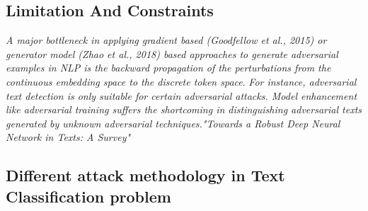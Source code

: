 \documentclass[%
	BCOR=8mm, %
	DIV=12, 
	toc=bibliography, %
	toc=listof, %
	oneside, %
	egregdoesnotlikesansseriftitles, %
	]{scrbook}
\begin{document}
\subsection{Limitation And Constraints}
\textit{A major bottleneck in applying gradient based (Goodfellow et al., 2015) or generator model (Zhao et al., 2018) based approaches to generate adversarial examples in NLP is
 the backward propagation of the perturbations from the continuous embedding space to the discrete token space}.\cite{garg_bae_2020} \textit{For instance, adversarial text detection 
 is only suitable for certain adversarial attacks. Model enhancement like adversarial training suffers the shortcoming in distinguishing adversarial texts generated by unknown adversarial 
 techniques."Towards a Robust Deep Neural Network in Texts: A Survey\(\)"} 
 
 
\subsection{Different attack methodology in Text Classification problem}


\end{document}
